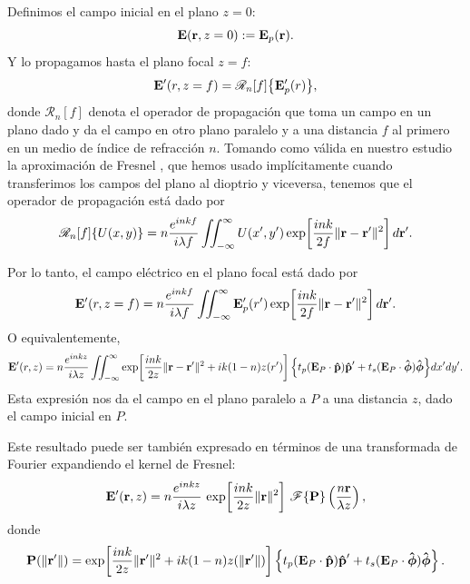 Definimos el campo inicial en el plano $z=0$:
\begin{equation}
    \vb{E}(\vb r, z=0)
    :=
    \vb{E}_p(\vb r).
\end{equation}
Y lo propagamos hasta el plano focal $z=f$:
\begin{equation}
    \vb{E}'(r, z=f)
    =
    \mathscr{R}_n [f] \big\{ \vb{E}_p'(r) \big\},
\end{equation}
donde $\mathscr R_n[f]$ denota el operador de propagación que toma un campo en un plano dado y da el campo en otro plano paralelo y a una distancia $f$ al primero en un medio de índice de refracción $n$. Tomando como válida en nuestro estudio la aproximación de Fresnel \cite{goodman2005}, que hemos usado implícitamente cuando transferimos los campos del plano al dioptrio y viceversa, tenemos que el operador de propagación está dado por
\begin{equation}
    \mathscr{R}_n [f] \{ U(x,y) \}
    =
    n\frac{e^{inkf}}{i \lambda f}
    \iint_{-\infty}^{\infty}
    U(x',y')
    \exp\!\left[
        \frac{ink}{2f}
        \lVert \vb{r}-\vb{r}' \rVert^2
    \right]
    d\vb{r}'.
\end{equation}

Por lo tanto, el campo eléctrico en el plano focal está dado por
\begin{equation}
    \vb{E}'(r, z=f)
    =
    n\frac{e^{inkf}}{i \lambda f}
    \iint_{-\infty}^{\infty}
    \vb{E}_p'(r')
    \exp\!\left[
        \frac{ink}{2f}
        \lVert \vb{r}-\vb{r}' \rVert^2
    \right]
    d\vb{r}'.
\end{equation}
O equivalentemente,
\begin{equation}
    \vb{E}'(r, z)
    =
    n\frac{e^{inkz}}{i \lambda z}
    \iint_{-\infty}^{\infty}
    \exp\!\left[
        \frac{ink}{2z}
        \lVert \vb{r}-\vb{r}' \rVert^2
        +
        ik(1-n)z(r')
    \right]
    \Big\{
        t_p (\vb{E}_P \cdot \bm{\hat{\mathbf{p}}}) \bm{\hat{\mathbf{p}}}'
        +
        t_s (\vb{E}_P \cdot \bm{\hat{\mathbf{\phi}}}) \bm{\hat{\mathbf{\phi}}}
    \Big\}
    dx'dy'.
\label{eq:E_field_at_z_3D}
\end{equation}
Esta expresión nos da el campo en el plano paralelo a $P$ a una distancia $z$, dado el campo inicial en $P$.

Este resultado puede ser también expresado en términos de una transformada de Fourier expandiendo el kernel de Fresnel:
\begin{equation}
\vb{E}'(\vb r,z)
=
n\frac{e^{inkz}}{i\lambda z}\,
\exp\!\left[
\frac{ink}{2z}\|\vb r\|^2
\right]
\,
\mathscr F\{\vb P\}
\left(
\frac{n\vb r}{\lambda z}
\right),
\label{E_in_observation_plane_as_FT_3D}
\end{equation}
donde
\begin{equation}
\vb P(\|\vb r'\|)
=
\exp\!\left[
\frac{ink}{2z}\|\vb r'\|^2
+
ik(1-n)z(\|\vb r'\|)
\right]
\left\{
t_p (\vb{E}_P\cdot \bm{\hat{\mathbf{p}}}) \bm{\hat{\mathbf{p}}}'
+
t_s (\vb{E}_P\cdot \bm{\hat{\mathbf{\phi}}}) \bm{\hat{\mathbf{\phi}}}
\right\}.
\label{eq:P_definition}
\end{equation}

